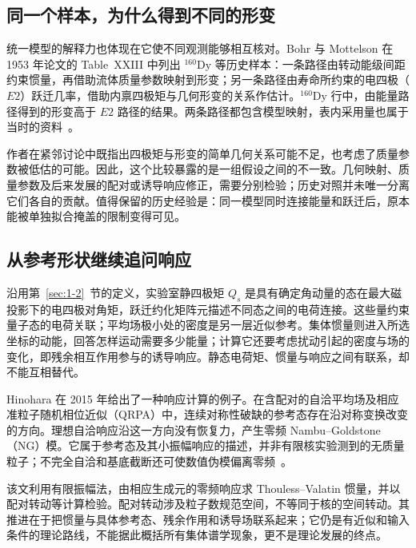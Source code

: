 \subsection{同一个样本，为什么得到不同的形变}\label{sec:1-3-3}

统一模型的解释力也体现在它使不同观测能够相互核对。Bohr 与 Mottelson 在 1953 年论文的 Table~XXIII 中列出 $^{160}\mathrm{Dy}$ 等历史样本：一条路径由转动能级间距约束惯量，再借助流体质量参数映射到形变；另一条路径由寿命所约束的电四极（$E2$）跃迁几率，借助内禀四极矩与几何形变的关系作估计。$^{160}\mathrm{Dy}$ 行中，由能量路径得到的形变高于 $E2$ 路径的结果。两条路径都包含模型映射，表内采用量也属于当时的资料~\cite{bohr-mottelson-1953-collective-individual-original}。

作者在紧邻讨论中既指出四极矩与形变的简单几何关系可能不足，也考虑了质量参数被低估的可能。因此，这个比较暴露的是一组假设之间的不一致。几何映射、质量参数及后来发展的配对或诱导响应修正，需要分别检验；历史对照并未唯一分离它们各自的贡献。值得保留的历史经验是：同一模型同时连接能量和跃迁后，原本能被单独拟合掩盖的限制变得可见。

\subsection{从参考形状继续追问响应}\label{sec:1-3-4}

沿用第~\ref{sec:1-2}~节的定义，实验室静四极矩 $Q_s$ 是具有确定角动量的态在最大磁投影下的电四极对角矩，跃迁约化矩阵元描述不同态之间的电荷连接。这些量约束量子态的电荷关联；平均场极小处的密度是另一层近似参考。集体惯量则进入所选坐标的动能，回答怎样运动需要多少能量；计算它还要考虑扰动引起的密度与场的变化，即残余相互作用参与的诱导响应。静态电荷矩、惯量与响应之间有联系，却不能互相替代。

Hinohara 在 2015 年给出了一种响应计算的例子。在含配对的自洽平均场及相应准粒子随机相位近似（QRPA）中，连续对称性破缺的参考态存在沿对称变换改变的方向。理想自洽响应沿这一方向没有恢复力，产生零频 Nambu--Goldstone（NG）模。它属于参考态及其小振幅响应的描述，并非有限核实验测到的无质量粒子；不完全自洽和基底截断还可使数值伪模偏离零频~\cite{hinohara-2015-nambu-goldstone-inertia-response}。

该文利用有限振幅法，由相应生成元的零频响应求 Thouless--Valatin 惯量，并以配对转动等计算检验。配对转动涉及粒子数规范空间，不等同于核的空间转动。其推进在于把惯量与具体参考态、残余作用和诱导场联系起来；它仍是有近似和输入条件的理论路线，不能据此概括所有集体谱学现象，更不是理论发展的终点。


